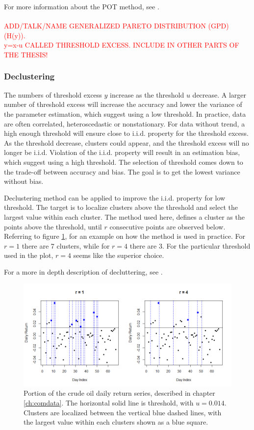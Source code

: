 For more information about the POT method, see \cite[Chapter~4]{stuart}.\\
\\
\textcolor{red}{ADD/TALK/NAME GENERALIZED PARETO DISTRIBUTION (GPD) (H(y)).\\
y=x-u CALLED THRESHOLD EXCESS. INCLUDE IN OTHER PARTS OF THE THESIS!}


\subsubsection{Declustering}
The numbers of threshold excess $y$ increase as the threshold $u$ decrease. A larger number of threshold excess will increase the accuracy and lower the variance of the parameter estimation, which suggest using a low threshold. In practice, data are often correlated, heteroscedastic or nonstationary. For data without trend, a high enough threshold will ensure close to  i.i.d. property for the threshold excess. As the threshold decrease, clusters could appear, and the threshold excess will no longer be i.i.d. Violation of the i.i.d. property will result in an estimation bias, which suggest using a high threshold. The selection of threshold comes down to the trade-off between accuracy and bias. The goal is to get the lowest variance without bias.

Declustering method can be applied to improve the i.i.d. property for low threshold. The target is to localize clusters above the threshold and select the largest value within each cluster. The method used here, defines a cluster as the points above the threshold, until $r$ consecutive points are observed below. Referring to figure \ref{fig:declustplot}, for an example on how the method is used in practice. For $r=1$ there are 7 clusters, while for $r=4$ there are 3. For the particular threshold used in the plot, $r=4$ seems like the superior choice. 

For a more in depth description of decluttering, see \cite[p.~100]{stuart}.
\begin{figure}
  \centering
    \includegraphics[width=1\textwidth]{fig/declustplot.png}
  \caption{Portion of the crude oil daily return series, described in chapter \ref{ch:comdata}. The horizontal solid line is threshold, with $u=0.014$. Clusters are localized between the vertical blue dashed lines, with the largest value within each clusters shown as a blue square.}
  \label{fig:declustplot}
\end{figure}

